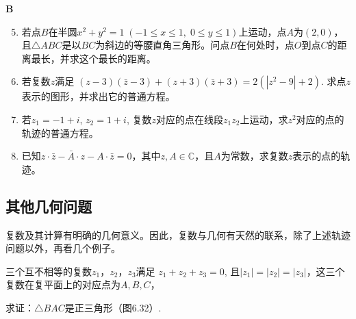 \begin{center}
    \bfseries B
\end{center}

\begin{enumerate}\setcounter{enumi}{4}
    \item 若点$B$在半圆$x^2+y^2=1\; (-1\le x\le 1,\; 0\le y\le 1)$上运动，点$A$为$(2,0)$，且$\triangle ABC$是以$BC$为斜边的等腰直角三角形。问点$B$在何处时，点$O$到点$C$的距离最长，并求这个最长的距离。
    \item 若复数$z$满足
    $(z-3)(\bar z-3)+(z+3)(\bar z+3)=2(|z^2-9|+2)$.
    求点$z$表示的图形，并求出它的普通方程。
    \item 若$z_1=-1+i$, $z_2=1+i$, 复数$z$对应的点在线段$z_1z_2$上运动，求$z^2$对应的点的轨迹的普通方程。
    \item 已知$z\cdot \bar z-\bar A\cdot z-A\cdot \bar z=0$，其中$z,A\in\mathbb{C}$，且$A$为常数，求复数$z$表示的点的轨迹。
\end{enumerate}

\subsection{其他几何问题}


\noindent
\begin{minipage}{.6\textwidth}
    \CTEXindent

    复数及其计算有明确的几何意义。因此，复数与几何有天然的联系，除了上述轨迹问题以外，再看几个例子。

\begin{example}
    三个互不相等的复数$z_1$，$z_2$，$z_3$满足
$z_1+z_2+z_3=0$, 且$|z_1|=|z_2|=|z_3|$，这三个复数在复平面上的对应点为$A,B,C$，

求证：$\triangle BAC$是正三角形（图6.32）.
\end{example}    
\end{minipage}\hfill
\begin{minipage}{.36\textwidth}
\centering
{}
\end{minipage}

